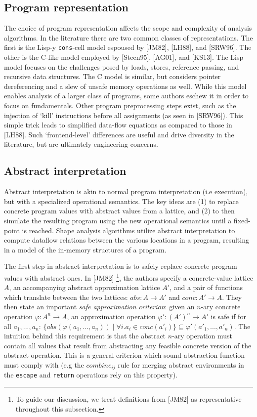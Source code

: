 \documentclass{article}
\begin{document}
\subsection{Program representation}

The choice of program representation affects the scope and complexity of
analysis algorithms. In the literature there are two common classes of
representations. The first is the Lisp-y \texttt{cons}-cell model espoused
by [JM82], [LH88], and [SRW96]. The other is the C-like model employed by
[Steen95], [AG01], and [KS13]. The Lisp model focuses on the challenges
posed by loads, stores, reference passing, and recursive data structures.
The C model is similar, but considers pointer dereferencing and a slew of
unsafe memory operations as well. While this model enables analysis of a
larger class of programs, some authors eschew it in order to focus on
fundamentals.  Other program preprocessing steps exist, such as the
injection of `kill' instructions before all assignments (as seen in
[SRW96]). This simple trick leads to simplified data-flow equations as
compared to those in [LH88]. Such `frontend-level' differences are useful
and drive diversity in the literature, but are ultimately engineering
concerns.

\subsection{Abstract interpretation}

Abstract interpretation is akin to normal program interpretation (i.e
execution), but with a specialized operational semantics. The key ideas are
(1) to replace concrete program values with abstract values from a lattice,
and (2) to then simulate the resulting program using the new operational
semantics until a fixed-point is reached. Shape analysis algorithms utilize
abstract interpretation to compute dataflow relations between the various
locations in a program, resulting in a model of the in-memory structures of
a program.

The first step in abstract interpretation is to safely replace concrete
program values with abstract ones. In [JM82] \footnote{To guide our
discussion, we treat definitions from [JM82] as representative throughout 
this subsection.}, the authors specify a concrete-value lattice $A$, an
accompanying abstract approximation lattice $A'$, and a pair of functions
which translate between the two lattices: $abs : A \rightarrow A'$ and $conc
: A' \rightarrow A$. They then state an important \textit{safe approximation
criterion}: given an $n$-ary concrete operation $\varphi : A^n \rightarrow
A$, an approximation operation $\varphi' : (A')^n \rightarrow A'$ is safe if
for all $a_1, ..., a_n$: $\{abs(\varphi(a_1, ..., a_n)) \mid \forall i.  a_i
\in conc(a'_i)\} \subseteq \varphi'(a'_1, ..., a'_n)$. The intuition behind
this requirement is that the abstract $n$-ary operation must contain all
values that result from abstracting any feasible concrete version of the
abstract operation.  This is a general criterion which sound abstraction
function must comply with (e.g the $combine_{ij}$ rule for merging abstract
environments in the \texttt{escape} and \texttt{return} operations rely on
this property).
\end{document}

